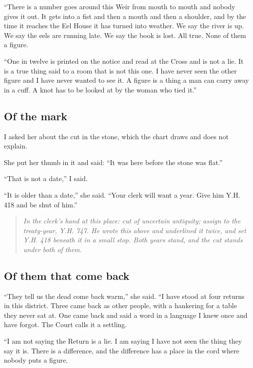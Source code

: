 \documentclass{design/chronicle}
\begin{document}
“There is a number goes around this Weir from mouth to mouth and nobody gives it out. It gets into a fist and then a mouth and then a shoulder, and by the time it reaches the Eel House it has turned into weather. We say the river is up. We say the eels are running late. We say the book is lost. All true. None of them a figure.

“One in twelve is printed on the notice and read at the Cross and is not a lie. It is a true thing said to a room that is not this one. I have never seen the other figure and I have never wanted to see it. A figure is a thing a man can carry away in a cuff. A knot has to be looked at by the woman who tied it.”

\subsection*{Of the mark}

I asked her about the cut in the stone, which the chart draws and does not explain.

She put her thumb in it and said: “It was here before the stone was flat.”

“That is not a date,” I said.

“It is older than a date,” she said. “Your clerk will want a year. Give him Y.H. 418 and be shut of him.”

\begin{quote}\itshape \emph{In the clerk’s hand at this place:} cut of uncertain antiquity; assign to the treaty-year, Y.H. 747. He wrote this above and underlined it twice, and set Y.H. 418 beneath it in a small stop. Both years stand, and the cut stands under both of them.\end{quote}

\subsection*{Of them that come back}

“They tell us the dead come back warm,” she said. “I have stood at four returns in this district. Three came back as other people, with a hankering for a table they never sat at. One came back and said a word in a language I knew once and have forgot. The Court calls it a settling.

“I am not saying the Return is a lie. I am saying I have not seen the thing they say it is. There is a difference, and the difference has a place in the cord where nobody puts a figure.
\end{document}
